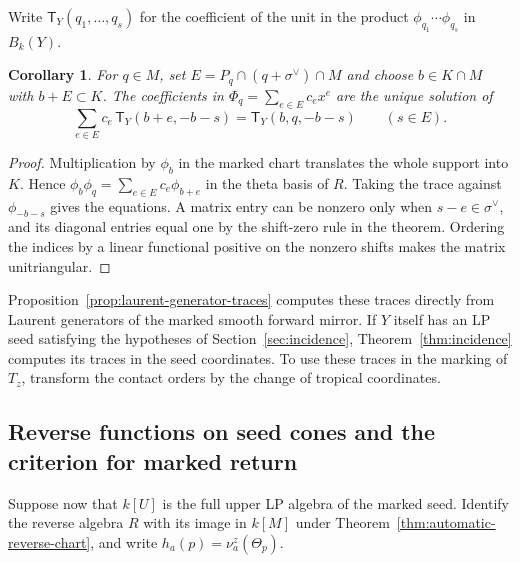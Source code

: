 \documentclass[11pt,reqno]{amsart}
\numberwithin{equation}{section}
\newtheorem{corollary}[theorem]{Corollary}
\theoremstyle{definition}
\theoremstyle{remark}
\begin{document}
Write \(\mathsf T_Y(q_1,\ldots,q_s)\) for the coefficient of the unit
in the product \(\phi_{q_1}\cdots\phi_{q_s}\) in \(B_k(Y)\).
\begin{corollary}\label{cor:reverse-finite-window-traces}
For \(q\in M\), set \(E=P_q\cap(q+\sigma^\vee)\cap M\) and choose
\(b\in K\cap M\) with \(b+E\subset K\). The coefficients in
\(\Phi_q=\sum_{e\in E} c_e x^e\) are the unique solution of
\[ \sum_{e\in E}c_e\,\mathsf T_Y(b+e,-b-s) =\mathsf T_Y(b,q,-b-s)\qquad(s\in E). \]
\end{corollary}
\begin{proof}
Multiplication by \(\phi_b\) in the marked chart translates the whole
support into \(K\). Hence
\(\phi_b\phi_q=\sum_{e\in E}c_e\phi_{b+e}\) in the theta basis of
\(R\). Taking the trace against \(\phi_{-b-s}\) gives the equations.
A matrix entry can be nonzero only when \(s-e\in\sigma^\vee\),
and its diagonal entries equal one by the shift-zero rule in the
theorem. Ordering the indices by a linear functional positive on the nonzero shifts makes the matrix unitriangular.
\end{proof}

Proposition~\ref{prop:laurent-generator-traces} computes these traces
directly from Laurent generators of the marked smooth forward mirror.
If \(Y\) itself has an LP seed satisfying the hypotheses of Section~\ref{sec:incidence}, Theorem~\ref{thm:incidence}
computes its traces in the seed coordinates. To use these traces in
the marking of \(T_z\), transform the contact orders by the change of
tropical coordinates.

\subsection{Reverse functions on seed cones and the criterion for marked return}
\label{subsec:reverse-seed-cones}

Suppose now that \(k[U]\) is the full upper LP algebra of the marked
seed. Identify the reverse algebra \(R\) with its image in \(k[M]\)
under Theorem~\ref{thm:automatic-reverse-chart}, and write
\(h_a(p)=\nu_a^z(\Theta_p)\).
\end{document}
